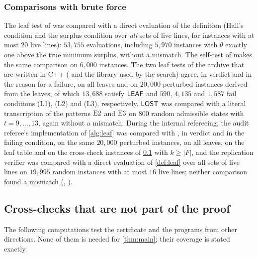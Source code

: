 \subsubsection*{Comparisons with brute force}
The leaf test of  was compared with a direct evaluation of the definition (Hall's condition
and the surplus condition over \emph{all} sets of live lines, for instances with at most $20$ live
lines): $53{,}755$ evaluations, including $5{,}970$ instances with $\theta$ exactly one above the true
minimum surplus, without a mismatch. The self-test of  makes the same comparison on $6{,}000$
instances. The two leaf tests of the archive that are written in C++ ( and the library used
by the search) agree,
in verdict and in the reason for a failure, on all leaves and on $20{,}000$ perturbed instances derived
from the leaves, of which $13{,}688$ satisfy $\mathsf{LEAF}$ and $590$, $4{,}135$ and $1{,}587$ fail
conditions (L1), (L2) and (L3), respectively. $\mathsf{LOST}$ was compared with a literal transcription of the
patterns $\mathrm{E2}$ and $\mathrm{E3}$ on $800$ random admissible states with $t=9,\dots,13$, again without a mismatch.
During the internal refereeing, the audit referee's implementation of \cref{alg:leaf} was compared with
, in verdict and in the failing condition, on the same $20{,}000$ perturbed instances, on all
leaves, on the leaf table and on the cross-check instances of \cref{ssec:supp-cross} with $k\ge|F|$, and the
replication verifier was compared with a direct evaluation of \cref{def:leaf} over all sets of live lines on
$19{,}995$ random instances with at most $16$ live lines; neither comparison found a mismatch
(, ).

\subsection{Cross-checks that are not part of the proof}\label{ssec:supp-cross}

The following computations test the certificate and the programs from other directions. None of them is
needed for \cref{thm:main}; their coverage is stated exactly.

